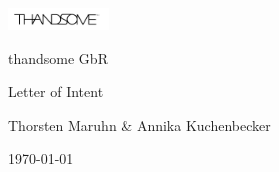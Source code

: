 \documentclass[a4paper,oneside,english,american,ngerman]{article}
\begin{document}
\begin{titlepage}
    \begin{flushright}
         \includegraphics[width=0.2\textwidth]{./pictures/logo.png}
    \end{flushright}
    
    \vspace{3cm}

    \begin{center}
        {\LARGE \color{stirlinggreen} thandsome GbR \par}
        \vspace{1cm}
        {\Large \color{stirlinggreen} Letter of Intent \par}
        \vspace{1.5cm}
        {\large Thorsten Maruhn \& Annika Kuchenbecker \par}
        \vfill
        {\large \color{stirlinggold} \today \par}
    \end{center}
\end{titlepage}

\tableofcontents
\newpage




%

%

\newpage
%

%

\clearpage
\listoffigures


\clearpage
\printglossary{}
\end{document}
